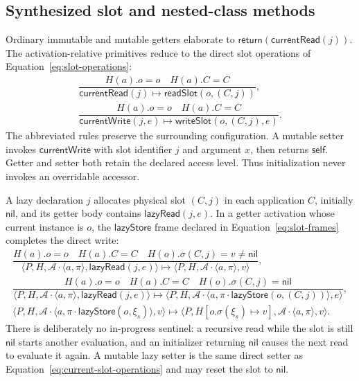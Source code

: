 \documentclass[11pt]{article}
\numberwithin{equation}{section}
\newcommand{\kw}[1]{\ensuremath{\mathsf{#1}}}
\newcommand{\nil}{\kw{nil}}
\begin{document}
\subsection{Synthesized slot and nested-class methods}
\label{sec:synthesized-methods}

Ordinary immutable and mutable getters elaborate to
$\kw{return}(\kw{currentRead}(j))$.  The activation-relative primitives reduce
to the direct slot operations of Equation~\eqref{eq:slot-operations}:
\begin{equation}\label{eq:current-slot-operations}
\begin{gathered}
\dfrac{H(a).o=o\quad H(a).C=C}
 {\kw{currentRead}(j)\longmapsto\kw{readSlot}(o,(C,j))},
\\[1.1ex]
\dfrac{H(a).o=o\quad H(a).C=C}
 {\kw{currentWrite}(j,e)\longmapsto\kw{writeSlot}(o,(C,j),e)}.
\end{gathered}
\end{equation}
The abbreviated rules preserve the surrounding configuration.  A mutable
setter invokes \kw{currentWrite} with slot identifier $j$ and argument $x$, then
returns \kw{self}.  Getter and setter both retain the declared access level.
Thus initialization never invokes an overridable accessor.

A lazy declaration $j$ allocates physical slot $(C,j)$ in each application $C$, initially $\nil$, and its
getter body contains $\kw{lazyRead}(j,e)$.  In a getter activation whose current
instance is $o$, the $\kw{lazyStore}$ frame declared in
Equation~\eqref{eq:slot-frames} completes the direct write:
\begin{equation}\label{eq:lazy-read}
\begin{array}{c}
\dfrac{H(a).o=o\quad H(a).C=C\quad H(o).\sigma(C,j)=v\ne\nil}
 {\langle P,H,\mathcal A\cdot\langle a,\pi\rangle,
    \kw{lazyRead}(j,e)\rangle
  \longmapsto
  \langle P,H,\mathcal A\cdot\langle a,\pi\rangle,v\rangle},\\[4mm]
\dfrac{H(a).o=o\quad H(a).C=C\quad H(o).\sigma(C,j)=\nil}
 {\langle P,H,\mathcal A\cdot\langle a,\pi\rangle,
    \kw{lazyRead}(j,e)\rangle
  \longmapsto
  \langle P,H,\mathcal A\cdot
    \langle a,\pi\cdot\kw{lazyStore}(o,(C,j))\rangle,e\rangle},\\[4mm]
 \langle P,H,\mathcal A\cdot
    \langle a,\pi\cdot\kw{lazyStore}(o,\xi_s)\rangle,v\rangle
 \longmapsto
 \langle P,H[o.\sigma(\xi_s)\mapsto v],
    \mathcal A\cdot\langle a,\pi\rangle,v\rangle.
\end{array}
\end{equation}
There is deliberately no in-progress sentinel: a recursive read while the slot
is still $\nil$ starts another evaluation, and an initializer returning $\nil$
causes the next read to evaluate it again.  A mutable lazy setter is the same
direct setter as Equation~\eqref{eq:current-slot-operations} and may reset the
slot to $\nil$.
\end{document}
